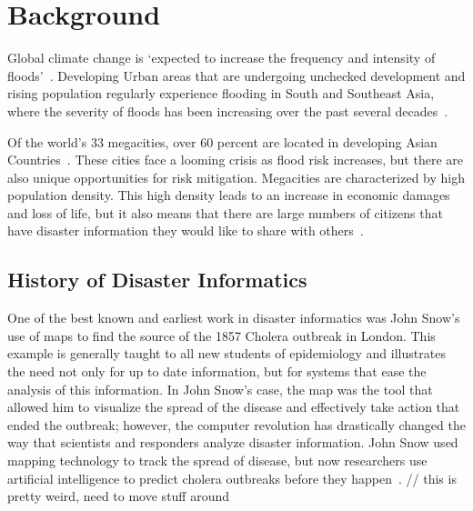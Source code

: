 \chapter{Background}

Global climate change is `expected to increase the frequency and intensity of
floods'~\cite{ahernGlobalHealthImpacts2005}. Developing Urban areas that are
undergoing unchecked development and rising population regularly experience
flooding%
in South and Southeast Asia, where the severity of floods has been increasing
over the past several decades~\cite{tortiFloodsSoutheastAsia2012}.

Of the world's 33 megacities, over 60 percent are located in developing Asian
Countries~\cite{unitednationsdepartmentofeconomicandsocialaffairsWorldCities20162016}.
These cities face a looming crisis as flood risk increases, but there are also
unique opportunities for risk mitigation. Megacities are characterized by high
population density. This high density leads to an increase in economic damages
and loss of life, but it also means that there are large numbers of citizens
that have disaster information they would like to share with
others~\cite{chanFloodRiskAsia2012}.

\section{History of Disaster Informatics} One of the best known and earliest
work in disaster informatics was John Snow's use of maps to find the source of
the 1857 Cholera outbreak in London\cite{rogersJohnSnowData2013}. This example
is generally taught to all new students of epidemiology and illustrates the need
not only for up to date information, but for systems that ease the
analysis of this information. In John Snow's case, the map was the tool that
allowed him to visualize the spread of the disease and effectively take action
that ended the outbreak; however, the computer revolution has drastically
changed the way that scientists and responders analyze disaster information.
John Snow used mapping technology to track the spread of disease, but now
researchers use artificial intelligence to predict cholera outbreaks before they
happen~\cite{radinskyMiningWebPredict2013}.
// this is pretty weird, need to move stuff around


